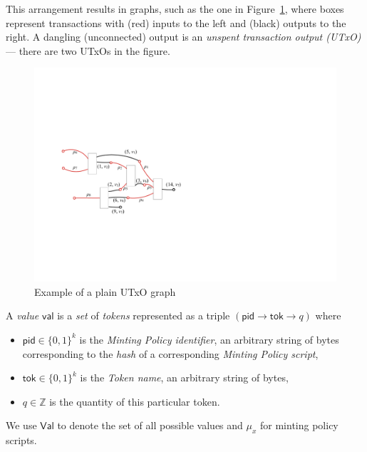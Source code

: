 This arrangement results in graphs, such as the one in Figure~\ref{fig:utxo-graph},
where boxes represent transactions with (red) inputs to the left and (black) outputs to the
right. A dangling (unconnected) output is an \emph{unspent transaction output (UTxO)} --- there are two UTxOs in the figure.

\begin{figure}[h]
  \centering
 \includegraphics[width=\textwidth/2]{figures/utxo-graph.pdf}
 \caption{Example of a plain UTxO graph}
  \label{fig:utxo-graph}
\end{figure}


\begin{definition}[Value]

A \emph{value} $\mathsf{val}$ is a \emph{set} of \emph{tokens} represented as a triple $(\mathsf{pid} \rightarrow \mathsf{tok} \rightarrow q)$ where
\begin{itemize}
    \item $\mathsf{pid} \in \{0,1\}^k$ is the \emph{Minting Policy identifier}, an arbitrary string of bytes corresponding to the \emph{hash} of a corresponding \emph{Minting Policy script},
    \item $\mathsf{tok} \in \{0,1\}^k$ is the \emph{Token name}, an arbitrary string of bytes,
    \item $q \in \mathbb{Z}$ is the quantity of this particular token.
\end{itemize}

\end{definition}

We use $\mathsf{Val}$ to denote the set of all possible values and  $\mu_x$ for minting policy scripts.

